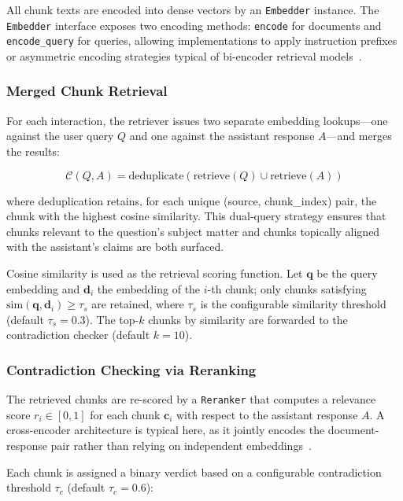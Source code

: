 \documentclass[11pt]{article}
\begin{document}
All chunk texts are encoded into dense vectors by an \texttt{Embedder} instance. The \texttt{Embedder} interface exposes two encoding methods: \texttt{encode} for documents and \texttt{encode\_query} for queries, allowing implementations to apply instruction prefixes or asymmetric encoding strategies typical of bi-encoder retrieval models~\cite{reimers2019sentencebert}.

\subsubsection{Merged Chunk Retrieval}

For each interaction, the retriever issues two separate embedding lookups---one against the user query $Q$ and one against the assistant response $A$---and merges the results:

\begin{equation}
    \mathcal{C}(Q, A) = \text{deduplicate}\!\left(\text{retrieve}(Q) \cup \text{retrieve}(A)\right)
\end{equation}

where deduplication retains, for each unique (source, chunk\_index) pair, the chunk with the highest cosine similarity. This dual-query strategy ensures that chunks relevant to the question's subject matter and chunks topically aligned with the assistant's claims are both surfaced.

Cosine similarity is used as the retrieval scoring function. Let $\mathbf{q}$ be the query embedding and $\mathbf{d}_i$ the embedding of the $i$-th chunk; only chunks satisfying $\text{sim}(\mathbf{q}, \mathbf{d}_i) \geq \tau_s$ are retained, where $\tau_s$ is the configurable similarity threshold (default $\tau_s = 0.3$). The top-$k$ chunks by similarity are forwarded to the contradiction checker (default $k = 10$).

\subsubsection{Contradiction Checking via Reranking}

The retrieved chunks are re-scored by a \texttt{Reranker} that computes a relevance score $r_i \in [0, 1]$ for each chunk $\mathbf{c}_i$ with respect to the assistant response $A$. A cross-encoder architecture is typical here, as it jointly encodes the document-response pair rather than relying on independent embeddings~\cite{nogueira2019passage}.

Each chunk is assigned a binary verdict based on a configurable contradiction threshold $\tau_c$ (default $\tau_c = 0.6$):
\end{document}
